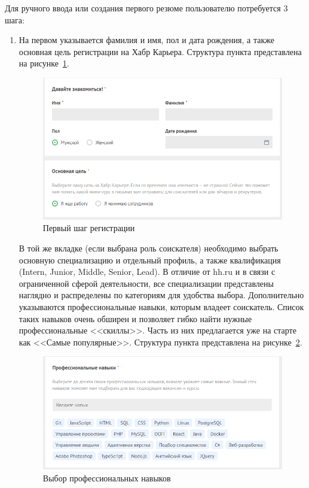 \documentclass[master, och, diploma]{SCWorks}
\begin{document}
Для ручного ввода или создания первого резюме пользователю потребуется 3 шага:
\begin{enumerate}
    \item На первом указывается фамилия и имя, пол и дата рождения, а также основная цель регистрации на Хабр Карьера. Структура пункта представлена на рисунке~\ref{fig:6}.
    \begin{figure}[!ht]
        \centering
        \includegraphics[width=12cm]{images/image15.png}
        \caption{\label{fig:6}%
            Первый шаг регистрации}
    \end{figure}
    В той же вкладке (если выбрана роль соискателя) необходимо выбрать основную специализацию и отдельный профиль, а также квалификация (Intern, Junior, Middle, Senior, Lead). В отличие от hh.ru и в связи с ограниченной сферой деятельности, все специализации представлены наглядно и распределены по категориям для удобства выбора. Дополнительно указываются профессиональные навыки, которым владеет соискатель. Список таких навыков очень обширен и позволяет гибко найти нужные профессиональные <<скиллы>>. Часть из них предлагается уже на старте как <<Самые популярные>>. Структура пункта представлена на рисунке~\ref{fig:7}.
    \begin{figure}[!ht]
        \centering
        \includegraphics[width=12cm]{images/image19.png}
        \caption{\label{fig:7}%
            Выбор профессиональных навыков}
    \end{figure}


\end{enumerate}
\end{document}
